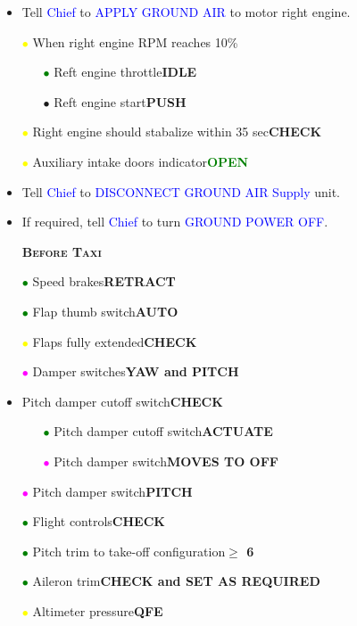 \documentclass[a4paper,12pt,dvipsnames]{letter}
\newcommand{\radio}[1]{\textcolor{blue}{#1}}
\newcommand{\button}[1]{\textbf{#1}}
\newcommand{\ok}[1]{\textcolor{Green}{\textbf{#1}}}
\newcommand{\myHead}[1]{{\LARGE\textsc{\textbf{#1}}}}
\newcommand{\bi}{\textcolor{ProcessBlue}{$\bullet$\;}}
\newcommand{\gi}{\textcolor{Green}{$\bullet$\;}}
\newcommand{\yi}{\textcolor{Yellow}{$\bullet$\;}}
\newcommand{\mi}{\textcolor{Magenta}{$\bullet$\;}}
\begin{document}
{\begin{itemize}
\begin{itemize}
  \item[\yi]Auxiliary intake doors indicator\dotfill\ok{BARBER POLE}
 \end{itemize}
 \item Tell \radio{Chief} to \radio{APPLY GROUND AIR} to motor right engine.
 \item[\yi] When right engine RPM reaches 10\;\%
 \begin{itemize}
  \item[\gi] Reft engine throttle\dotfill\button{IDLE}
  \item[\bi] Reft engine start\dotfill\button{PUSH}
 \end{itemize}
 \item[\yi] Right engine should stabalize within 35 sec\dotfill\button{CHECK}
 \item[\yi] Auxiliary intake doors indicator\dotfill\ok{OPEN}
 \item Tell \radio{Chief} to \radio{DISCONNECT GROUND AIR Supply} unit.
 \item If required, tell \radio{Chief} to turn \radio{GROUND POWER OFF}.
\end{itemize}
\newpage
\begin{itemize}
 \item[] \myHead{Before Taxi}
 \item[\gi] Speed brakes\dotfill\button{RETRACT}
 \item[\gi] Flap thumb switch\dotfill\button{AUTO}
 \item[\yi] Flaps fully extended\dotfill\button{CHECK}
 \item[\mi] Damper switches\dotfill\button{YAW and PITCH}
 \item Pitch damper cutoff switch\dotfill\button{CHECK}
 \begin{itemize}
  \item[\gi] Pitch damper cutoff switch\dotfill\button{ACTUATE}
  \item[\mi] Pitch damper switch\dotfill\button{MOVES TO OFF}  
 \end{itemize}
 \item[\mi] Pitch damper switch\dotfill\button{PITCH}
 \item[\gi] Flight controls\dotfill\button{CHECK}
 \item[\gi] Pitch trim to take-off configuration\dotfill\button{$\ge$ 6}
 \item[\gi] Aileron trim\dotfill\button{CHECK and SET AS REQUIRED}
 \item[\yi] Altimeter pressure\dotfill\button{QFE}

\end{itemize}}
\end{document}
